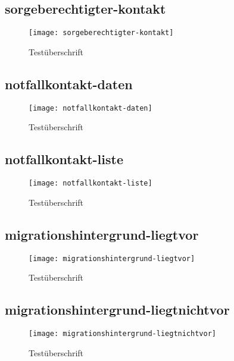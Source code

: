 \begin{landscape}
\subsection{sorgeberechtigter-kontakt}
\begin{figure}[H]
    \centering
    \caption{Testüberschrift}
    \begin{adjustbox}{width=0.6\linewidth, center}
        \texttt{[image: sorgeberechtigter-kontakt]}
    \end{adjustbox}
\end{figure}

\subsection{notfallkontakt-daten}
\begin{figure}[H]
    \centering
    \caption{Testüberschrift}
    \begin{adjustbox}{width=0.6\linewidth, center}
        \texttt{[image: notfallkontakt-daten]}
    \end{adjustbox}
\end{figure}

\subsection{notfallkontakt-liste}
\begin{figure}[H]
    \centering
    \caption{Testüberschrift}
    \begin{adjustbox}{width=\linewidth, center}
        \texttt{[image: notfallkontakt-liste]}
    \end{adjustbox}
\end{figure}

\subsection{migrationshintergrund-liegtvor}
\begin{figure}[H]
    \centering
    \caption{Testüberschrift}
    \begin{adjustbox}{width=\linewidth, center}
        \texttt{[image: migrationshintergrund-liegtvor]}
    \end{adjustbox}
\end{figure}

\subsection{migrationshintergrund-liegtnichtvor}
\begin{figure}[H]
    \centering
    \caption{Testüberschrift}
    \begin{adjustbox}{width=\linewidth, center}
        \texttt{[image: migrationshintergrund-liegtnichtvor]}
    \end{adjustbox}
\end{figure}


\end{landscape}
